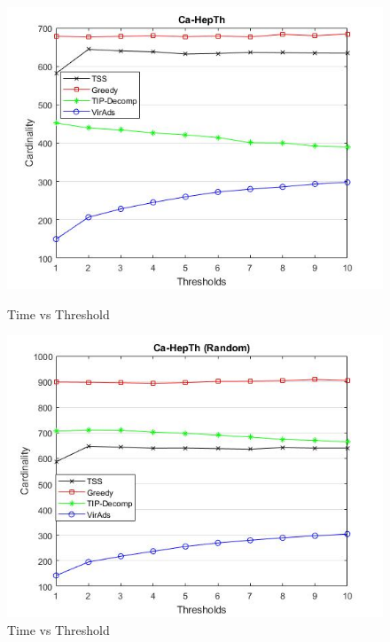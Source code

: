 \begin{figure}[h!]
\begin{minipage}[t]{0.50\textwidth}
\includegraphics[width=\linewidth,keepaspectratio=true]{images/ca-hepthtime.jpg}
\caption{Time vs Threshold}
\label{fase1}
\end{minipage}
\begin{minipage}[t]{0.50\textwidth}
\includegraphics[width=\linewidth,keepaspectratio=true]{images/ca-hepthrandomtime.jpg}
\caption{Time vs Threshold}
\end{minipage}
\end{figure}
	
